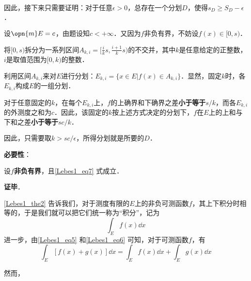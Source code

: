 因此，接下来只需要证明：对于任意$\epsilon>0$，总存在一个分划$D$，使得$s_D\geq S_D-\epsilon$．

设$\opn{m}E=c$，由题设知$c<+\infty$．又因为$f$非负有界，不妨设$f(x)\in [0, s)$．

将$[0, s)$拆分为一系列区间$A_{k, i}=[\frac{i}{k}s, \frac{i+1}{k}s)$的不交并，其中$k$是任意给定的正整数，$i$是取值范围为$[0, k)$的整数．

利用区间$A_{k, i}$来对$E$进行分划：$E_{k, i}=\{x\in E|f(x)\in A_{k, i}\}$．显然，固定$k$时，各$E_{k, i}$构成$E$的一组分划．

对于任意固定的$k$，在每个$E_{k, i}$上，$f$的上确界和下确界之差\textbf{小于等于}$s/k$，而各$E_{k, i}$的外测度之和为$c$．因此，该固定的$k$按上述方式决定的分划下，$f$在$E$上的上和与下和之差\textbf{小于等于}$sc/k$．

因此，只需要取$k>sc/\epsilon$，所得分划就是所要的$D$．

\textbf{必要性}：

设$f$\textbf{非负有界}，且\autoref{Lebes1_eq7} 式成立．




\textbf{证毕}．

\autoref{Lebes1_the2} 告诉我们，对于测度有限的$E$上的非负可测函数$f$，其上下积分时相等的，于是我们就可以把它们统一称为“积分”，记为
\begin{equation}
\int_E f(x) \dd x
\end{equation}
进一步，由\autoref{Lebes1_eq5} 和\autoref{Lebes1_eq6} 可知，对于可测函数$f$，有
\begin{equation}
\int_E [f(x)+g(x)] \dd x=\int_E f(x) \dd x+\int_E g(x) \dd x
\end{equation}

然而，








